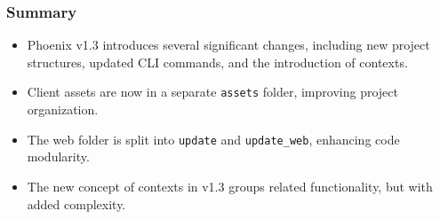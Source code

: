 \documentclass[aspectratio=169, table]{beamer}
\begin{document}
	\begin{frame}
		\frametitle{Summary}
		\begin{itemize}
			\item Phoenix v1.3 introduces several significant changes, including new project structures, updated CLI commands, and the introduction of contexts.
			\item Client assets are now in a separate \texttt{assets} folder, improving project organization.
			\item The web folder is split into \texttt{update} and \texttt{update\_web}, enhancing code modularity.
			\item The new concept of contexts in v1.3 groups related functionality, but with added complexity.
		\end{itemize}
	\end{frame}
	
\end{document}
